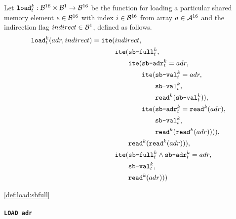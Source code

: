 Let $\LOAD^k_t: \BVSORT \times \BVSORT[1] \to \BVSORT$ be the function for loading a particular shared memory element $e \in \BVSORT$ with index $i \in \BVSORT$ from array $a \in \ASORT$ and the indirection flag $indirect \in \BVSORT[1]$, defined as follows.
\begin{align}
  \LOAD^k_t(adr, indirect) = \ITE(& indirect, \\
  & \ITE(\SBFULL^k_t, \label{def:load:sbfull} \\
  & \ITEindent \ITE(\SBADR^k_t = adr, \\
  & \ITEindent \ITEindent \ITE(\SBVAL^k_t = adr, \\
  & \ITEindent \ITEindent \ITEindent \SBVAL^k_t, \\
  & \ITEindent \ITEindent \ITEindent \READ^k(\SBVAL^k_t)), \\
  & \ITEindent \ITEindent \ITE(\SBADR^k_t = \READ^k(adr), \\
  & \ITEindent \ITEindent \ITEindent \SBVAL^k_t, \\
  & \ITEindent \ITEindent \ITEindent \READ^k(\READ^k(adr)))), \\
  & \ITEindent \READ^k(\READ^k(adr))), \\
  & \ITE(\SBFULL^k_t \land \SBADR^k_t = adr, \\
  & \ITEindent \SBVAL^k_t, \\
  & \ITEindent \READ^k(adr)))
\end{align}

\ref{def:load:sbfull}



\paragraph{\texttt{LOAD adr}}

